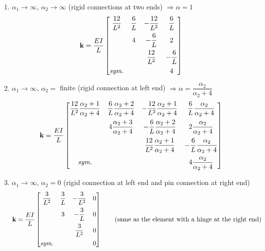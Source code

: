 \begin{example}
\begin{enumerate}[leftmargin=*]
  \item $\alpha_1\to\infty$, $\alpha_2\to\infty$ (rigid connections at two ends) $\Rightarrow\alpha = 1$
    \begin{equation*}
      \mathbf{k} = \frac{EI}{L}\begin{bmatrix}\dfrac{12}{L^2} & \dfrac6L & -\dfrac{12}{L^2} & \dfrac6L\\[8pt] & 4 & -\dfrac6L & 2\\[8pt] & & \dfrac{12}{L^2} & -\dfrac6L\\[8pt] \textit{sym.} & & & 4\end{bmatrix}
    \end{equation*}
  \item $\alpha_1\to\infty$, $\alpha_2 =$ finite (rigid connection at left end) $\Rightarrow\alpha = \dfrac{\alpha_2}{\alpha_2+4}$
    \begin{equation*}
      \mathbf{k} = \frac{EI}{L}
      \begin{bmatrix}
        \dfrac{12}{L^2}\dfrac{\alpha_2+1}{\alpha_2+4} & \dfrac6L\dfrac{\alpha_2+2}{\alpha_2+4} & -\dfrac{12}{L^2}\dfrac{\alpha_2+1}{\alpha_2+4} & \dfrac6L\dfrac{\alpha_2}{\alpha_2+4}\\[10pt]
        & 4\dfrac{\alpha_2+3}{\alpha_2+4} & -\dfrac6L\dfrac{\alpha_2+2}{\alpha_2+4} & 2\dfrac{\alpha_2}{\alpha_2+4}\\[10pt]
        & & \dfrac{12}{L^2}\dfrac{\alpha_2+1}{\alpha_2+4} & -\dfrac6L\dfrac{\alpha_2}{\alpha_2+4}\\[10pt]
        \textit{sym.} & & & 4\dfrac{\alpha_2}{\alpha_2+4}
      \end{bmatrix}
    \end{equation*}
  \item $\alpha_1\to\infty$, $\alpha_2 = 0$ (rigid connection at left end and pin connection at right end)
    \begin{equation*}
      \mathbf{k} = \frac{EI}{L}\begin{bmatrix}\dfrac{3}{L^2} & \dfrac3L & -\dfrac{3}{L^2} & 0\\[8pt] & 3 & -\dfrac3L & 0\\[8pt] & & \dfrac{3}{L^2} & 0\\[8pt] \textit{sym.} & & & 0\end{bmatrix}\qquad\text{(same as the element with a hinge at the right end)}
    \end{equation*}
\end{enumerate}
\end{example}

